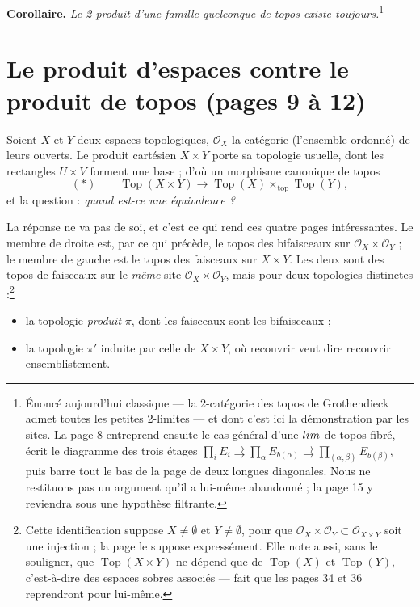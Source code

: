\documentclass[11pt,a4paper]{article}
\begin{document}
\textbf{Corollaire.} \emph{Le 2-produit d'une famille quelconque de topos
existe toujours.}\footnote{Énoncé aujourd'hui classique — la 2-catégorie des
topos de Grothendieck admet toutes les petites 2-limites — et dont c'est ici la
démonstration par les sites. La page 8 entreprend ensuite le cas général d'une
$\varprojlim$ de topos fibré, écrit le diagramme des trois étages
$\prod_{i} E_{i} \rightrightarrows \prod_{\alpha} E_{b(\alpha)}
\rightrightarrows \prod_{(\alpha,\beta)} E_{b(\beta)}$, puis barre tout le bas
de la page de deux longues diagonales. Nous ne restituons pas un argument
qu'il a lui-même abandonné ; la page 15 y reviendra sous une hypothèse
filtrante.}

\section*{Le produit d'espaces contre le produit de topos (pages 9 à 12)}

Soient $X$ et $Y$ deux espaces topologiques, $\mathcal{O}_{X}$ la catégorie
(l'ensemble ordonné) de leurs ouverts. Le produit cartésien $X \times Y$ porte
sa topologie usuelle, dont les rectangles $U \times V$ forment une base ; d'où
un morphisme canonique de topos
\[
(*) \qquad \operatorname{Top}(X \times Y) \longrightarrow
\operatorname{Top}(X) \times_{\mathrm{top}} \operatorname{Top}(Y),
\]
et la question : \emph{quand est-ce une équivalence ?}

La réponse ne va pas de soi, et c'est ce qui rend ces quatre pages
intéressantes. Le membre de droite est, par ce qui précède, le topos des
bifaisceaux sur $\mathcal{O}_{X} \times \mathcal{O}_{Y}$ ; le membre de gauche
est le topos des faisceaux sur $X \times Y$. Les deux sont des topos de
faisceaux sur le \emph{même} site $\mathcal{O}_{X} \times \mathcal{O}_{Y}$,
mais pour deux topologies distinctes :\footnote{Cette identification suppose
$X \neq \emptyset$ et $Y \neq \emptyset$, pour que
$\mathcal{O}_{X} \times \mathcal{O}_{Y} \subset \mathcal{O}_{X \times Y}$ soit
une injection ; la page le suppose expressément. Elle note aussi, sans le
souligner, que $\operatorname{Top}(X \times Y)$ ne dépend que de
$\operatorname{Top}(X)$ et $\operatorname{Top}(Y)$, c'est-à-dire des espaces
sobres associés — fait que les pages 34 et 36 reprendront pour lui-même.}

\begin{itemize}
\item la topologie \emph{produit} $\pi$, dont les faisceaux sont les
bifaisceaux ;
\item la topologie $\pi'$ induite par celle de $X \times Y$, où recouvrir veut
dire recouvrir ensemblistement.
\end{itemize}
\end{document}
